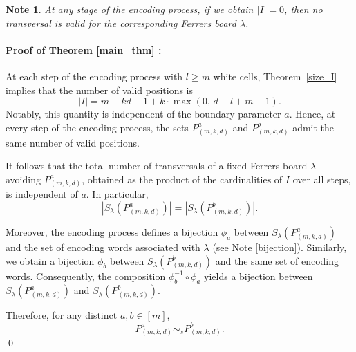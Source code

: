 \documentclass[12pt, english, a4paper]{article}
\theoremstyle{plain}
\newtheorem{note}{Note}
\theoremstyle{definition}
\theoremstyle{remark}
\begin{document}


\begin{note}
 At any stage of the encoding process, if we obtain $|I|=0$, then no transversal is valid for the corresponding Ferrers board $\lambda$.
\end{note}

\paragraph{Proof of Theorem \ref{main_thm} :}
At each step of the encoding process with \(l \ge m\) white cells, Theorem~\ref{size_I} implies that the number of valid positions is
\[
|I| = m - kd - 1 + k \cdot \max(0,\, d - l + m - 1).
\]
Notably, this quantity is independent of the boundary parameter \(a\). Hence, at every step of the encoding process, the sets \(P^a_{(m,k,d)}\) and \(P^b_{(m,k,d)}\) admit the same number of valid positions.

It follows that the total number of transversals of a fixed Ferrers board \(\lambda\) avoiding \(P^a_{(m,k,d)}\), obtained as the product of the cardinalities of \(I\) over all steps, is independent of \(a\). In particular,
\[
|S_{\lambda}(P^a_{(m,k,d)})| = |S_{\lambda}(P^b_{(m,k,d)})|.
\]

Moreover, the encoding process defines a bijection \(\phi_a\) between \(S_{\lambda}(P^a_{(m,k,d)})\) and the set of encoding words associated with \(\lambda\) (see Note \ref{bijection}). Similarly, we obtain a bijection \(\phi_b\) between \(S_{\lambda}(P^b_{(m,k,d)})\) and the same set of encoding words. Consequently, the composition \(\phi_b^{-1} \circ \phi_a\) yields a bijection between \(S_{\lambda}(P^a_{(m,k,d)})\) and \(S_{\lambda}(P^b_{(m,k,d)})\).

Therefore, for any distinct \(a,b \in [m]\),
$$
P^a_{(m,k,d)} \sim_s P^b_{(m,k,d)}.
$$
\qed
\end{document}

